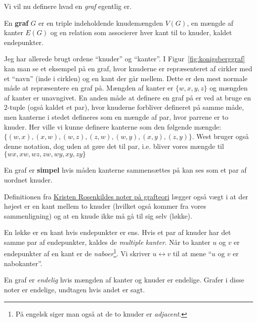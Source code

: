 Vi vil nu definere hvad en \textit{graf} egentlig er.

\begin{definition}[Graf]
En \textbf{graf} $G$ er en triple indeholdende knudemængden $V(G)$, en mængde af kanter $E(G)$ og en relation som associerer hver kant til to knuder, kaldet endepunkter.
\end{definition}

Jeg har allerede brugt ordene ``knuder'' og ``kanter''. I Figur~\ref{fig:konigsberggraf} kan man se et eksempel på en graf, hvor knuderne er repræsenteret af cirkler med et ``navn'' (inde i cirklen) og en kant der går mellem. Dette er den mest normale måde at repræsentere en graf på. Mængden af kanter er $\{w,x,y,z\}$ og mængden af kanter er unavngivet. En anden måde at definere en graf på er ved at bruge en 2-tuple (også kaldet et par), hvor knuderne forbliver defineret på samme måde, men kanterne i stedet defineres som en mængde af par, hvor parrene er to knuder. Her ville vi kunne definere kanterne som den følgende mængde: $\{(w,x), (x,w), (w,z), (z,w), (w,y), (x,y), (z,y)\}$. West bruger også denne notation, dog uden at gøre det til par, i.e. bliver vores mængde til $\{wx, xw, wz, zw, wy, xy, zy\}$

\begin{definition}
En graf er \textbf{simpel} hvis måden kanterne sammensættes på kan ses som et par af uordnet knuder.
\end{definition}

Definitionen fra \href{https://www.georgmohr.dk/noter/grafteori2014.pdf}{Kristen Rosenkildes noter på grafteori} lægger også vægt i at der højest er en kant mellem to knuder (hvilket også kommer fra vores sammenligning) og at en knude ikke må gå til sig selv (løkke).

\begin{definition}[Løkke]
En løkke er en kant hvis endepunkter er ens. Hvis et par af knuder har det samme par af endepunkter, kaldes de \textit{multiple kanter}. Når to kanter $u$ og $v$ er endepunkter af en kant er de \textit{naboer}\footnote{På engelsk siger man også at de to knuder er \textit{adjacent}.}. Vi skriver $u \leftrightarrow v$ til at mene ``$u$ og $v$ er nabokanter''.
\end{definition}

En graf er \textit{endelig} hvis mængden af kanter og knuder er endelige. Grafer i disse noter er endelige, undtagen hvis andet er sagt.

